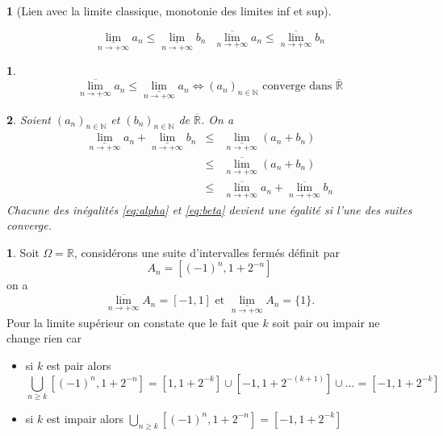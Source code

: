 \documentclass[8pt,notheorems]{beamer}
\def \R{\mathbb R}
\def \N{\mathbb N}
\newcommand{\RL}{\mathbb{R}}
\def \limsup{\underset{n\rightarrow+\infty}{\overline{\lim}}}
\def \liminf{\underset{n\rightarrow+\infty}{\underline{\lim}}}
\newtheorem{prop}{\translate{Proposition}}
\theoremstyle{definition}
\theoremstyle{example}
\newtheorem{example}{\translate{Exemple}}
\newtheorem{remark}{\translate{Remarque}}
\theoremstyle{mystyle}
\theoremstyle{plain}
\begin{document}
\begin{frame}[allowframebreaks]
\begin{prop}[Lien avec la limite classique, monotonie des limites inf et sup]
\begin{enumerate}
$$
\underset{n\rightarrow+\infty}{\underline{\lim}}a_n \leq\underset{n\rightarrow+\infty}{\underline{\lim}}b_n\text{ }\underset{n\rightarrow+\infty}{\overline{\lim}}a_n\leq \underset{n\rightarrow+\infty}{\overline{\lim}}b_n
$$
\end{enumerate}
\end{prop}
\begin{remark}
$$
\underset{n\rightarrow+\infty}{\overline{\lim}}a_n\leq\underset{n\rightarrow+\infty}{\underline{\lim}}a_n\Leftrightarrow (a_n)_{n\in\N}\text{ converge dans }\overline{\RL}
$$
\end{remark}
\begin{prop}\label{prop:Comparaisonlimsupinf}
Soient $(a_n)_{n\in \N}$ et $(b_n)_{n\in \N}$ de $\overline{\RL}$. On a
\begin{eqnarray}
\liminf a_n + \liminf b_n&\leq &\liminf (a_n+b_n)\label{eq:alpha}\\
&\leq& \limsup (a_n+b_n)\nonumber\\
&\leq& \limsup a_n + \limsup b_n \label{eq:beta}
\end{eqnarray}
Chacune des inégalités \eqref{eq:alpha} et \eqref{eq:beta} devient une égalité si l'une des suites converge.
\end{prop}
\begin{example}
Soit $\Omega = \R$, considérons une suite d'intervalles fermés définit par 
$$
A_n = \left[(-1)^n, 1 + 2^{-n}\right]
$$
on a 
$$
\limsup A_n = [-1, 1]\text{ et }\liminf A_n = \{1\}.
$$
Pour la limite supérieur on constate que le fait que $k$ soit pair ou impair ne change rien car
\begin{itemize}
    \item si $k$ est pair alors 
    $$
    \bigcup_{n\geq k}\left[(-1)^n, 1 + 2^{-n}\right] = \left[1, 1 + 2^{-k}\right]\cup \left[-1, 1 + 2^{-(k+1)}\right]\cup\ldots = \left[-1, 1 + 2^{-k}\right] 
    $$
    \item si $k$ est impair alors $\bigcup_{n\geq k}\left[(-1)^n, 1 + 2^{-n}\right] = \left[-1, 1 + 2^{-k}\right]$
\end{itemize}
\end{example}
\end{frame}
\end{document}
